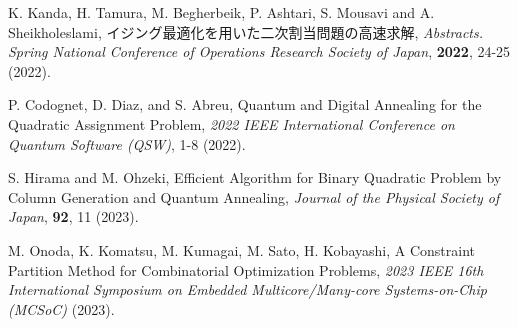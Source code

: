 \documentclass[submit,techrep,noauthor]{ipsj}
\begin{document}
\begin{thebibliography}{10}
K. Kanda, H. Tamura, M. Begherbeik, P. Ashtari, S. Mousavi and A. Sheikholeslami, イジング最適化を用いた二次割当問題の高速求解, {\it Abstracts. Spring National Conference of Operations Research Society of Japan}, {\bf 2022}, 24-25 (2022).

P. Codognet, D. Diaz, and S. Abreu, Quantum and Digital Annealing for the Quadratic Assignment Problem, {\it 2022 IEEE International Conference on Quantum Software (QSW)}, 1-8 (2022).

S. Hirama and M. Ohzeki, Efficient Algorithm for Binary Quadratic Problem by Column Generation and Quantum Annealing, {\it Journal of the Physical Society of Japan}, {\bf 92}, 11 (2023).

M. Onoda, K. Komatsu, M. Kumagai, M. Sato, H. Kobayashi, A Constraint Partition Method for Combinatorial Optimization Problems, {\it 2023 IEEE 16th International Symposium on Embedded Multicore/Many-core Systems-on-Chip (MCSoC)} (2023).

\end{thebibliography}
\end{document}

